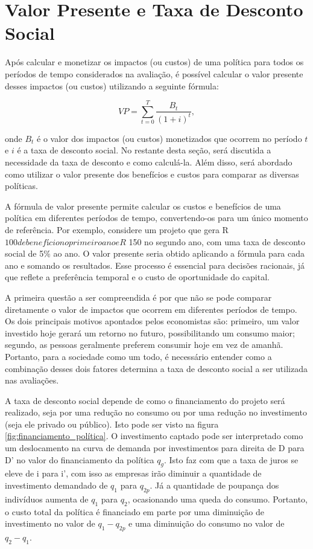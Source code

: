 \documentclass[12pt,letterpaper]{article}
\newcommand{\1}{\mathbbm{1}}
\numberwithin{equation}{section}
\begin{document}
\section{Valor Presente e Taxa de Desconto Social}

Após calcular e monetizar os impactos (ou custos) de uma política para todos os períodos de tempo considerados na avaliação, é possível calcular o valor presente desses impactos (ou custos) utilizando a seguinte fórmula:

\begin{equation}
    VP = \sum_{t=0}^T\frac{B_{t}}{(1+i)^{t}},
\end{equation}

\noindent onde $B_{t}$ é o valor dos impactos (ou custos) monetizados que ocorrem no período $t$ e $i$ é a taxa de desconto social. No restante desta seção, será discutida a necessidade da taxa de desconto e como calculá-la. Além disso, será abordado como utilizar o valor presente dos benefícios e custos para comparar as diversas políticas.

A fórmula de valor presente permite calcular os custos e benefícios de uma política em diferentes períodos de tempo, convertendo-os para um único momento de referência. Por exemplo, considere um projeto que gera R$ 100 de benefício no primeiro ano e R$ 150 no segundo ano, com uma taxa de desconto social de 5\% ao ano. O valor presente seria obtido aplicando a fórmula para cada ano e somando os resultados. Esse processo é essencial para decisões racionais, já que reflete a preferência temporal e o custo de oportunidade do capital.

A primeira questão a ser compreendida é por que não se pode comparar diretamente o valor de impactos que ocorrem em diferentes períodos de tempo. Os dois principais motivos apontados pelos economistas são: primeiro, um valor investido hoje gerará um retorno no futuro, possibilitando um consumo maior; segundo, as pessoas geralmente preferem consumir hoje em vez de amanhã. Portanto, para a sociedade como um todo, é necessário entender como a combinação desses dois fatores determina a taxa de desconto social a ser utilizada nas avaliações.

A taxa de desconto social depende de como o financiamento do projeto será realizado, seja por uma redução no consumo ou por uma redução no investimento (seja ele privado ou público). Isto pode ser visto na figura \ref{fig:financiamento_política}. O investimento captado pode ser interpretado como um deslocamento na curva de demanda por investimentos para direita de D para D' no valor do financiamento da política $q_{g}$. Isto faz com que a taxa de juros se eleve de i para i', com isso as empresas irão diminuir a quantidade de investimento demandado de $q_{1}$ para $q_{2p}$. Já a quantidade de poupança dos indivíduos aumenta de $q_{1}$ para $q_{2}$, ocasionando uma queda do consumo. Portanto, o custo total da política é financiado em parte por uma diminuição de investimento no valor de $q_{1}-q_{2p}$ e uma diminuição do consumo no valor de $q_{2}-q_{1}$.
\end{document}
